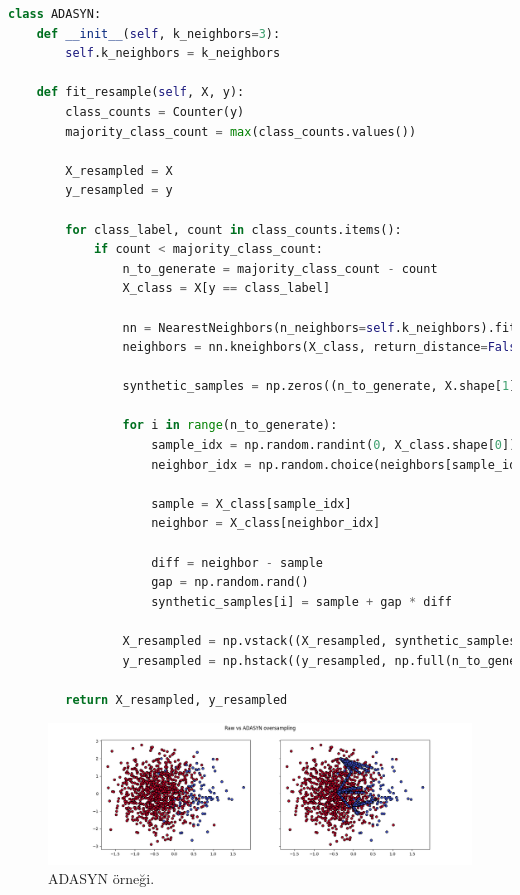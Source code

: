 \begin{lstlisting}[language=Python]
class ADASYN:
    def __init__(self, k_neighbors=3):
        self.k_neighbors = k_neighbors

    def fit_resample(self, X, y):
        class_counts = Counter(y)
        majority_class_count = max(class_counts.values())

        X_resampled = X
        y_resampled = y

        for class_label, count in class_counts.items():
            if count < majority_class_count:
                n_to_generate = majority_class_count - count
                X_class = X[y == class_label]

                nn = NearestNeighbors(n_neighbors=self.k_neighbors).fit(X_class)
                neighbors = nn.kneighbors(X_class, return_distance=False)

                synthetic_samples = np.zeros((n_to_generate, X.shape[1]))

                for i in range(n_to_generate):
                    sample_idx = np.random.randint(0, X_class.shape[0])
                    neighbor_idx = np.random.choice(neighbors[sample_idx][1:])

                    sample = X_class[sample_idx]
                    neighbor = X_class[neighbor_idx]

                    diff = neighbor - sample
                    gap = np.random.rand()
                    synthetic_samples[i] = sample + gap * diff

                X_resampled = np.vstack((X_resampled, synthetic_samples))
                y_resampled = np.hstack((y_resampled, np.full(n_to_generate, class_label)))

        return X_resampled, y_resampled
\end{lstlisting}

\newpage

\begin{figure}[h]
    \centering
    \includegraphics[width=1\textwidth]{images/Raw vs ADASYN oversampling.png}
    \caption{ADASYN örneği.}
    \label{fig:enter-label}
\end{figure}

